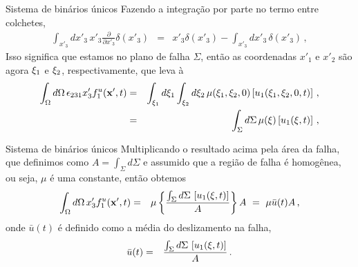 \documentclass{beamer}
\newcommand{\xvec}{\mathbf{x}}
\newcommand{\xivec}{\boldmath \xi}
\begin{document}
\begin{frame}{Sistema de bin\'arios \'unicos}
		\justifying
Fazendo a integração por parte no termo entre colchetes, 
	\begin{eqnarray*}
		\int_{x'_{3}}dx'_{3} \, x'_{3} \frac{\partial }{\partial x'_{3}} \delta(x'_3)  &=& x'_{3}\delta(x'_{3}) - \int_{x'_3} dx'_3\,\delta(x'_3) \, ,
	\end{eqnarray*} 
 Isso significa que estamos no plano de falha $\Sigma$, ent\~ao as coordenadas 
$x'_1$ e $x'_2$ s\~ao agora $\xivec_1$ e $\xivec_2$, respectivamente, que leva \`a
\begin{eqnarray*}
	\int_{\Omega}d\Omega\, \epsilon_{231} x'_{3} f^{u}_{1}(\xvec',t) &=& \int_{\xivec_1}d\xivec_1 \int_{\xivec_2}d\xivec_2 \,  \mu(\xivec_{1},\xivec_{2},0) \left[ u_{1}(\xivec_{1},\xivec_{2},0,t)\right] \, ,\\
	&=& \int_{\Sigma}d\Sigma \, \mu(\xivec) \left[ u_{1}(\xivec,t)\right]   \, ,    
\end{eqnarray*}
\end{frame}

\begin{frame}{Sistema de binários únicos}
		\justifying
Multiplicando o resultado acima pela \'area da falha, que definimos como $A = \int_{\Sigma} d\Sigma$ e  
assumido que a regi\~ao de falha \'e homog\^enea, ou seja, $\mu$ \'e uma constante, ent\~ao obtemos 
\begin{eqnarray} 
\label{momtotal1}
\int_{\Omega}d\Omega\, x'_{3} f^{u}_{1}(\xvec',t) &=&  \mu  \left\{ \frac{ \int_{\Sigma}d\Sigma \,  \left[ u_{1}(\xivec,t)\right]}{A} \right\} A  \,\,  = \,\, \mu \bar{u}(t) A \, ,  \nonumber
\end{eqnarray} 
onde $\bar{u}(t)$ \'e definido como a m\'edia do deslizamento na falha,
\begin{eqnarray*}  
	\bar{u}(t) &=& \frac{ \int_{\Sigma}d\Sigma \,  \left[ u_{1}(\xivec,t)\right]}{A} \, .
\end{eqnarray*}  
\end{frame}
\end{document}
